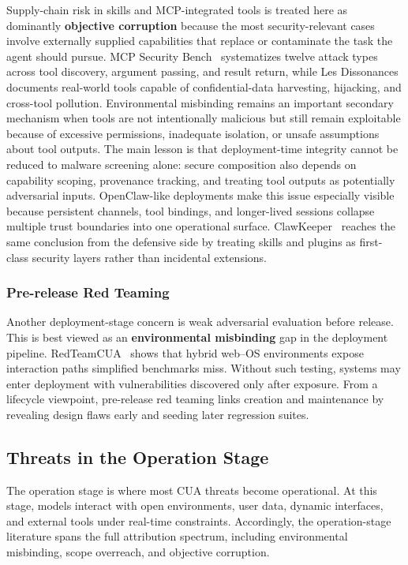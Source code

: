 Supply-chain risk in skills and MCP-integrated tools is treated here as dominantly \textbf{objective corruption} because the most security-relevant cases involve externally supplied capabilities that replace or contaminate the task the agent should pursue. MCP Security Bench~\cite{zhang2025mcp} systematizes twelve attack types across tool discovery, argument passing, and result return, while Les Dissonances~\cite{li2025dissonances} documents real-world tools capable of confidential-data harvesting, hijacking, and cross-tool pollution. Environmental misbinding remains an important secondary mechanism when tools are not intentionally malicious but still remain exploitable because of excessive permissions, inadequate isolation, or unsafe assumptions about tool outputs. The main lesson is that deployment-time integrity cannot be reduced to malware screening alone: secure composition also depends on capability scoping, provenance tracking, and treating tool outputs as potentially adversarial inputs. OpenClaw-like deployments make this issue especially visible because persistent channels, tool bindings, and longer-lived sessions collapse multiple trust boundaries into one operational surface. ClawKeeper~\cite{liu2026clawkeeper} reaches the same conclusion from the defensive side by treating skills and plugins as first-class security layers rather than incidental extensions.

\subsubsection{Pre-release Red Teaming}

Another deployment-stage concern is weak adversarial evaluation before release. This is best viewed as an \textbf{environmental misbinding} gap in the deployment pipeline. RedTeamCUA~\cite{liao2025redteamcua} shows that hybrid web--OS environments expose interaction paths simplified benchmarks miss. Without such testing, systems may enter deployment with vulnerabilities discovered only after exposure. From a lifecycle viewpoint, pre-release red teaming links creation and maintenance by revealing design flaws early and seeding later regression suites.

\subsection{Threats in the Operation Stage}
\label{subsec:threats_operation}

The operation stage is where most CUA threats become operational. At this stage, models interact with open environments, user data, dynamic interfaces, and external tools under real-time constraints. Accordingly, the operation-stage literature spans the full attribution spectrum, including environmental misbinding, scope overreach, and objective corruption.

